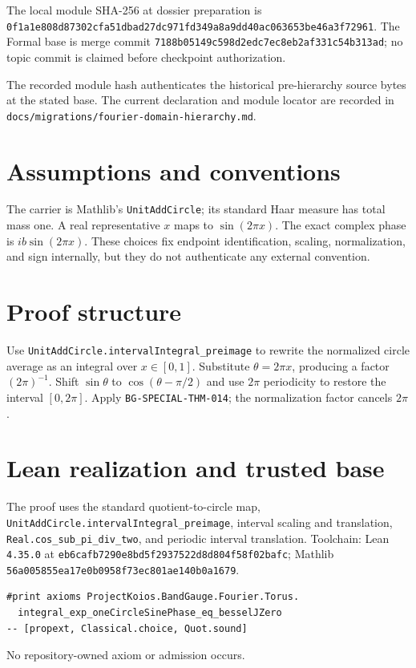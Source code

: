 \documentclass[10pt]{article}
\begin{document}
The local module SHA-256 at dossier preparation is
\texttt{0f1a1e808d87302cfa51dbad27dc971fd349a8a9dd40ac063653be46a3f72961}. The Formal base is
merge commit \texttt{7188b05149c598d2edc7ec8eb2af331c54b313ad}; no topic commit is claimed before
checkpoint authorization.

The recorded module hash authenticates the historical pre-hierarchy source bytes at the stated base. The current declaration and module locator are recorded in \texttt{docs/migrations/fourier-domain-hierarchy.md}.

\section{Assumptions and conventions}
The carrier is Mathlib's \texttt{UnitAddCircle}; its standard Haar measure has total mass one. A
real representative $x$ maps to $\sin(2\pi x)$. The exact complex phase is $i b\sin(2\pi x)$.
These choices fix endpoint identification, scaling, normalization, and sign internally, but they do
not authenticate any external convention.

\section{Proof structure}
Use \texttt{UnitAddCircle.intervalIntegral\_preimage} to rewrite the normalized circle average as
an integral over $x\in[0,1]$. Substitute $\theta=2\pi x$, producing a factor $(2\pi)^{-1}$. Shift
$\sin\theta$ to $\cos(\theta-\pi/2)$ and use $2\pi$ periodicity to restore the interval
$[0,2\pi]$. Apply \texttt{BG-SPECIAL-THM-014}; the normalization factor cancels $2\pi$.

\section{Lean realization and trusted base}
The proof uses the standard quotient-to-circle map, \texttt{UnitAddCircle.intervalIntegral\_preimage},
interval scaling and translation, \texttt{Real.cos\_sub\_pi\_div\_two}, and periodic interval
translation. Toolchain: Lean \texttt{4.35.0} at
\texttt{eb6cafb7290e8bd5f2937522d8d804f58f02bafc}; Mathlib
\texttt{56a005855ea17e0b0958f73ec801ae140b0a1679}.
\begin{verbatim}
#print axioms ProjectKoios.BandGauge.Fourier.Torus.
  integral_exp_oneCircleSinePhase_eq_besselJZero
-- [propext, Classical.choice, Quot.sound]
\end{verbatim}
No repository-owned axiom or admission occurs.
\end{document}
